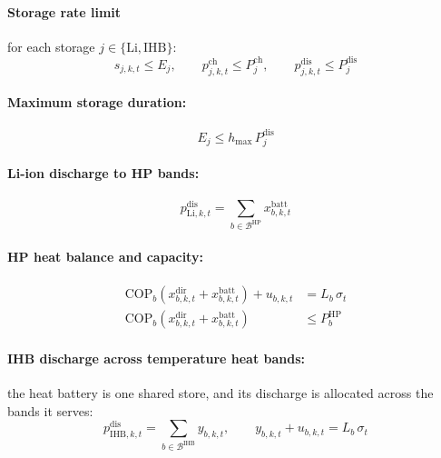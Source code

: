 \documentclass[11pt]{article}
\newcommand{\Li}{\mathrm{Li}}
\newcommand{\IHB}{\mathrm{IHB}}
\newcommand{\HP}{\mathrm{HP}}
\newcommand{\ch}{\mathrm{ch}}
\newcommand{\dis}{\mathrm{dis}}
\begin{document}
\paragraph{Storage rate limit} for each storage $j \in \{\Li, \IHB\}$:
\begin{equation}
s_{j,k,t} \leq E_{j}, \qquad p_{j,k,t}^{\ch} \leq P_{j}^{\ch}, \qquad p_{j,k,t}^{\dis} \leq P_{j}^{\dis}
\label{eq:rate}
\end{equation}

\paragraph{Maximum storage duration:}
\begin{equation}
E_{j} \leq h_{\max}\, P_{j}^{\dis}
\label{eq:duration}
\end{equation}

\paragraph{Li-ion discharge to HP bands:}
\begin{equation}
p_{\Li,k,t}^{\dis} = \sum_{b \in \mathcal{B}^{\HP}} x_{b,k,t}^{\mathrm{batt}}
\label{eq:li-dis}
\end{equation}

\paragraph{HP heat balance and capacity:}
\begin{align}
\mathrm{COP}_{b}\left( x_{b,k,t}^{\mathrm{dir}} + x_{b,k,t}^{\mathrm{batt}} \right) + u_{b,k,t} &= L_{b}\,\sigma_{t} \label{eq:hp-balance}\\
\mathrm{COP}_{b}\left( x_{b,k,t}^{\mathrm{dir}} + x_{b,k,t}^{\mathrm{batt}} \right) &\leq P_{b}^{\HP} \label{eq:hp-cap}
\end{align}

\paragraph{IHB discharge across temperature heat bands:} the heat battery is one shared store, and its discharge is allocated across the bands it serves:
\begin{equation}
p_{\IHB,k,t}^{\dis} = \sum_{b \in \mathcal{B}^{\IHB}} y_{b,k,t}, \qquad y_{b,k,t} + u_{b,k,t} = L_{b}\,\sigma_{t}
\label{eq:ihb-balance}
\end{equation}
\end{document}
